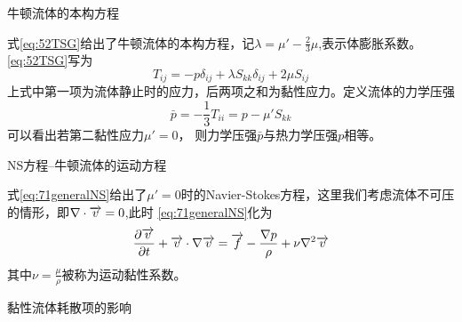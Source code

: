 牛顿流体的本构方程

式\eqref{eq:52TSG}给出了牛顿流体的本构方程，记$\lambda=\mu'-\frac{2}{3}\mu$,表示体膨胀系数。
\eqref{eq:52TSG}写为
\begin{equation}
T_{ij}=-p\delta_{ij}+\lambda S_{kk} \delta_{ij} +2\mu S_{ij}
\end{equation}
上式中第一项为流体静止时的应力，后两项之和为黏性应力。定义流体的力学压强
\begin{equation}
\bar{p}=-\frac{1}{3}T_{ii}
       =p-\mu'S_{kk}
\end{equation}
可以看出若第二黏性应力$\mu'=0$，
则力学压强$\bar{p}$与热力学压强$p$相等。

NS方程--牛顿流体的运动方程

式\eqref{eq:71generalNS}给出了$\mu'=0$时的Navier-Stokes方程，这里我们考虑流体不可压的情形，即$\nabla\cdot \overrightarrow{v}=0$,此时
\eqref{eq:71generalNS}化为
\begin{equation}\label{eq:102unCompressibleNS}
\frac{\partial \overrightarrow{v}}{\partial t}+\overrightarrow{v}\cdot\nabla\overrightarrow{v}=\overrightarrow{f}-\frac{\nabla p}{\rho}+\nu \nabla^2 \overrightarrow{v}
\end{equation}
其中$\nu=\frac{\mu}{\rho}$被称为运动黏性系数。

黏性流体耗散项的影响

